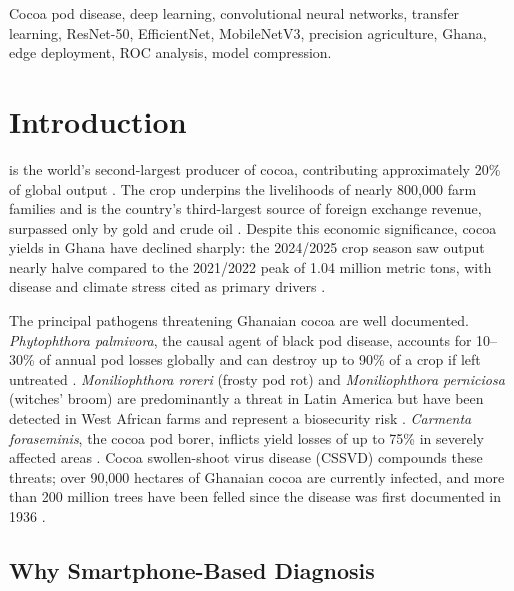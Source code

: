 \documentclass[conference,10pt]{IEEEtran}
\begin{document}
\begin{IEEEkeywords}
Cocoa pod disease, deep learning, convolutional neural networks, transfer
learning, ResNet-50, EfficientNet, MobileNetV3, precision agriculture, Ghana,
edge deployment, ROC analysis, model compression.
\end{IEEEkeywords}

\section{Introduction}\label{sec:intro}

 is the world's second-largest producer of cocoa, contributing
approximately 20\% of global output \cite{usda2025}. The crop underpins the
livelihoods of nearly 800{,}000 farm families and is the country's third-largest
source of foreign exchange revenue, surpassed only by gold and crude oil
\cite{gcb2022}. Despite this economic significance, cocoa yields in Ghana have
declined sharply: the 2024/2025 crop season saw output nearly halve compared
to the 2021/2022 peak of 1.04 million metric tons, with disease and climate
stress cited as primary drivers \cite{usda2025}.

The principal pathogens threatening Ghanaian cocoa are well documented.
\textit{Phytophthora palmivora}, the causal agent of black pod disease,
accounts for 10--30\% of annual pod losses globally and can destroy up to 90\%
of a crop if left untreated \cite{alvarado2025}.
\textit{Moniliophthora roreri} (frosty pod rot) and \textit{Moniliophthora
perniciosa} (witches' broom) are predominantly a threat in Latin America but
have been detected in West African farms and represent a biosecurity risk
\cite{buenano2024}. \textit{Carmenta foraseminis}, the cocoa pod borer,
inflicts yield losses of up to 75\% in severely affected areas
\cite{pagaduan2026}. Cocoa swollen-shoot virus disease (CSSVD) compounds these
threats; over 90{,}000 hectares of Ghanaian cocoa are currently infected, and
more than 200 million trees have been felled since the disease was first
documented in 1936 \cite{gcb2022}.

\subsection{Why Smartphone-Based Diagnosis}
\end{document}
